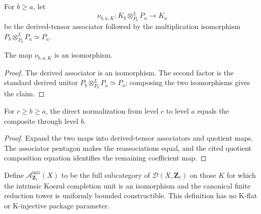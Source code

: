 \begin{definition}
\label{def:weil-efi-coeff-zl-reduction-normalization}
For $b\geq a$, let
\[
 \nu_{b,a,K}:
 K_b\otimes^L_{P_b}P_a\longrightarrow K_a
\]
be the derived-tensor associator followed by the multiplication isomorphism
$P_b\otimes^L_{P_b}P_a\simeq P_a$.
\end{definition}

\begin{lemma}
\label{lemma:weil-efi-coeff-zl-reduction-normalization-iso}
The map $\nu_{b,a,K}$ is an isomorphism.
\end{lemma}
\begin{proof}
The derived associator is an isomorphism.  The second factor is the standard
derived unitor
$P_b\otimes^L_{P_b}P_a\simeq P_a$; composing the two isomorphisms gives the
claim.
\end{proof}

\begin{lemma}
\label{lemma:weil-efi-coeff-zl-reduction-normalization-cocycle}
For $c\geq b\geq a$, the direct normalization from level $c$ to level $a$
equals the composite through level $b$.
\end{lemma}
\begin{proof}
Expand the two maps into derived-tensor associators and quotient maps.  The
associator pentagon makes the reassociations equal, and the cited quotient
composition equation identifies the remaining coefficient map.
\end{proof}

\begin{definition}
\label{def:weil-efi-coeff-intrinsic-constructible-zl-category}
Define $\mathscr A^{\mathrm{intr}}_{\mathbf Z_\ell}(X)$ to be the full
subcategory of $\mathcal D(X,\mathbf Z_\ell)$ on those $K$ for which the
intrinsic Koszul completion unit is an isomorphism and the canonical finite
reduction tower is uniformly bounded constructible.  This definition has no
K-flat or K-injective package parameter.
\end{definition}


